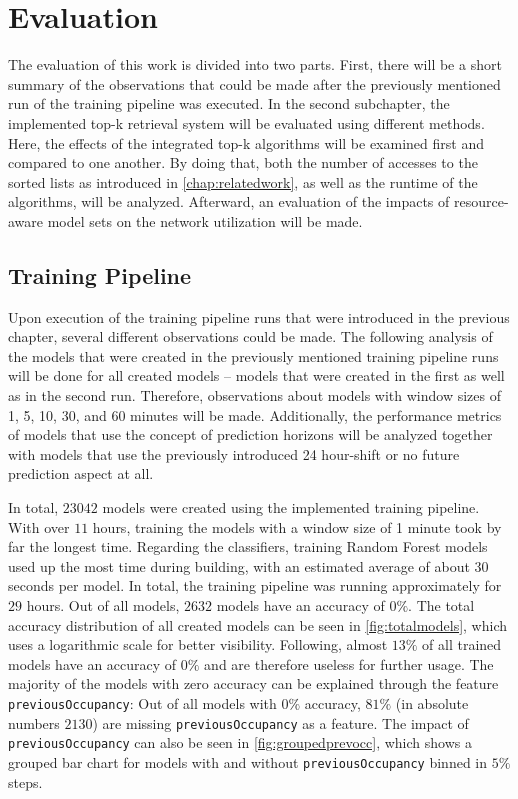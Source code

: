 \chapter{Evaluation} \label{chap:evaluation}

The evaluation of this work is divided into two parts. First, there will be a short summary of the observations that could be made after the previously mentioned run of the training pipeline was executed. In the second subchapter, the implemented top-k retrieval system will be evaluated using different methods. Here, the effects of the integrated top-k algorithms will be examined first and compared to one another. By doing that, both the number of accesses to the sorted lists as introduced in \autoref{chap:relatedwork}, as well as the runtime of the algorithms, will be analyzed. Afterward, an evaluation of the impacts of resource-aware model sets on the network utilization will be made.
  
  
  
  \section{Training Pipeline}
  
  Upon execution of the training pipeline runs that were introduced in the previous chapter, several different observations could be made. The following analysis of the models that were created in the previously mentioned training pipeline runs will be done for all created models – models that were created in the first as well as in the second run. Therefore, observations about models with window sizes of 1, 5, 10, 30, and 60 minutes will be made. Additionally, the performance metrics of models that use the concept of prediction horizons will be analyzed together with models that use the previously introduced 24 hour-shift or no future prediction aspect at all.

  In total, $23042$ models were created using the implemented training pipeline. With over $11$ hours, training the models with a window size of 1 minute took by far the longest time. Regarding the classifiers, training Random Forest models used up the most time during building, with an estimated average of about 30 seconds per model. In total, the training pipeline was running approximately for $29$ hours. Out of all models, $2632$ models have an accuracy of $0\%$. The total accuracy distribution of all created models can be seen in \autoref{fig:totalmodels}, which uses a logarithmic scale for better visibility. Following, almost $13\%$ of all trained models have an accuracy of $0\%$ and are therefore useless for further usage. The majority of the models with zero accuracy can be explained through the feature \texttt{previousOccupancy}: Out of all models with $0\%$ accuracy, $81\%$ (in absolute numbers $2130$) are missing \texttt{previousOccupancy} as a feature. The impact of \texttt{previousOccupancy} can also be seen in \autoref{fig:groupedprevocc}, which shows a grouped bar chart for models with and without \texttt{previousOccupancy} binned in $5\%$ steps.

